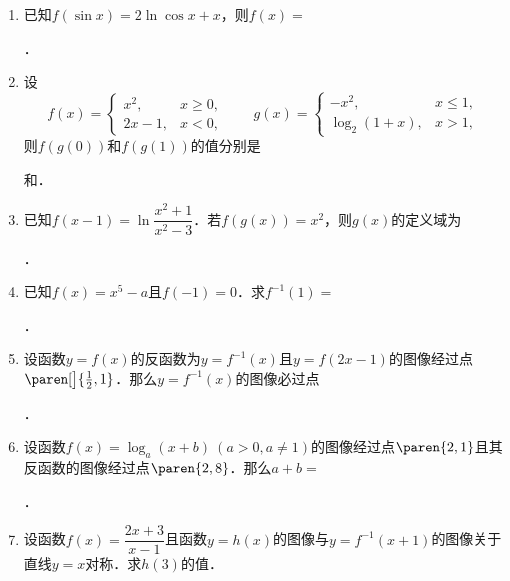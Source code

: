 \documentclass[a4paper,punct=CCT]{ctexbook}
\theoremstyle{definition}
\theoremstyle{remark}
\newif\ifshowsol
\let\leq\leqslant
\let\le\leq
\let\geq\geqslant
\let\ge\geq}
\begin{document}
\begin{enumerate}
\item 已知\(f(\sin x) = 2 \ln \cos x + x\)，则\(f(x) =\)
  \ifshowsol
  \uline{\makebox[20em]{\(f(x) = \ln(1-x^2) + 2k\pi + \arcsin x,\ k \in \Z\)}}．
  \else
  \uline{\makebox[20em]{}}．
  \fi

\item 设
  \[
    f(x) =
    \begin{cases}
      x^2, & x \ge 0, \\
      2x - 1, & x < 0,
    \end{cases}
    \qquad
    g(x) =
    \begin{cases}
      -x^2, & x \le 1, \\
      \log_2(1+x), & x > 1,
    \end{cases}
  \]
  则\(f(g(0))\)和\(f(g(1))\)的值分别是
  \ifshowsol
  \uline{\makebox[3em]{\(0\)}}和\uline{\makebox[3em]{\(-3\)}}．
  \else
  \uline{\makebox[3em]{}}和\uline{\makebox[3em]{}}．
  \fi

\item 已知\(f(x-1) = \ln \dfrac{x^2+1}{x^2-3}\)．若\(f(g(x)) = x^2\)，则\(g(x)\)的定义域为
  \ifshowsol
  \uline{\makebox[10em]{\(\paren{-\infty, 0} \cup \paren{0, +\infty}\)}}．

  实际上，\(g\)是可以求出来的，就是
  \[
    g(x) = \pm \sqrt{\frac{3e^{x^2}+1}{e^{x^2}-1}} - 1.
  \]
  \else
  \uline{\makebox[10em]{}}．
  \fi

\item 已知\(f(x) = x^5 - a\)且\(f(-1) = 0\)．求\(f^{-1}(1) =\)
  \ifshowsol
  \uline{\makebox[3em]{\(0\)}}．
  \else
  \uline{\makebox[3em]{}}．
  \fi

\item 设函数\(y = f(x)\)的反函数为\(y = f^{-1}(x)\)且\(y = f(2x-1)\)的图像经过点\(\paren[\big]{\frac12, 1}\)．那么\(y = f^{-1}(x)\)的图像必过点
  \ifshowsol
  \uline{\makebox[3em]{\(\paren{1, 0}\)}}．
  \else
  \uline{\makebox[3em]{}}．
  \fi

\item 设函数\(f(x) = \log_a(x+b)\ (a > 0, a \ne 1)\)的图像经过点\(\paren{2,1}\)且其反函数的图像经过点\(\paren{2,8}\)．那么\(a + b =\)
  \ifshowsol
  \uline{\makebox[3em]{\(4\)}}．

  实际上，\(a = 3\)且\(b = 1\)．
  \else
  \uline{\makebox[3em]{}}．
  \fi

\item 设函数\(f(x) = \dfrac{2x+3}{x-1}\)且函数\(y = h(x)\)的图像与\(y = f^{-1}(x+1)\)的图像关于直线\(y = x\)对称．求\(h(3)\)的值．

  \ifshowsol
  这题相当于是求\(3 = f^{-1}(x+1)\)时\(x\)的值．有\(f(3) = f(\,f^{-1}(x+1)) = x+1 = \dfrac92\)，所以\(h(3) = \dfrac72\)．

  实际上，\(h(x) = 1 + \dfrac{5}{x-1}\)．
  \fi

\end{enumerate}
\fi
\end{document}
